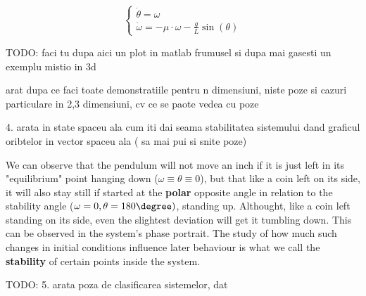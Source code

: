 \[
\begin{cases}
  \dot{\theta}  = \omega \\
  \dot{\omega} = -\mu \cdot \omega - \frac{g}{L}\sin(\theta)
\end{cases}
\]

\par
TODO: faci tu dupa aici un plot in matlab frumusel
si dupa mai gasesti un exemplu mistio in 3d

arat dupa ce faci toate demonstratiile pentru n dimensiuni, niste poze si cazuri particulare in 2,3 dimensiuni, cv ce se paote vedea cu poze

4. arata in state spaceu ala cum iti dai seama stabilitatea sistemului dand graficul oribtelor in vector spaceu ala ( sa mai pui si snite poze)

We can observe that the pendulum will not move an inch if it is just left in its "equilibrium" point hanging down ($\omega \equiv \theta \equiv 0$), but that like a coin left on its side, it will also stay still if started at the \textbf{polar} opposite angle in relation to the stability angle ($\omega =0 , \theta = 180 \degree)$, standing up.
Althought, like a coin left standing on its side, even the slightest deviation will get it tumbling down. This can be observed in the system's phase portrait. The study of how much such changes in initial conditions influence later behaviour is what we call the \textbf{stability} of certain points inside the system.

TODO:
5. arata poza de clasificarea sistemelor, dat \\